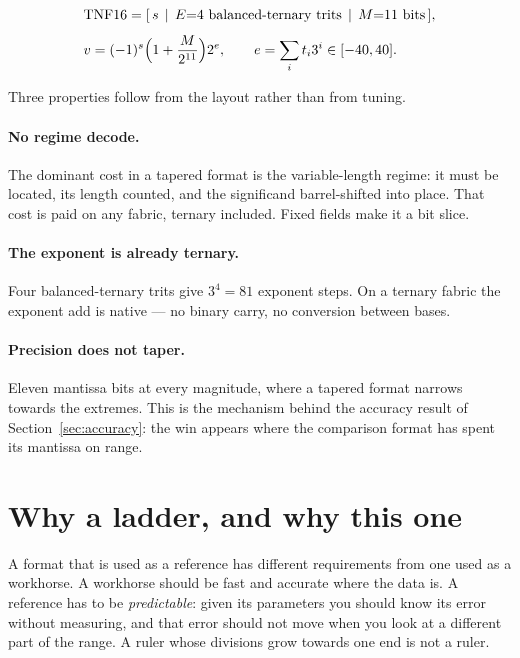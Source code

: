\documentclass[11pt]{article}
\theoremstyle{definition}
\begin{document}
\begin{equation}
\begin{aligned}
&\text{TNF16}=[\,s\,\mid\,E{=}4\ \text{balanced-ternary trits}\,\mid\,M{=}11\ \text{bits}\,],\\[4pt]
&v=(-1)^{s}\Bigl(1+\frac{M}{2^{11}}\Bigr)2^{e},
\qquad e=\sum_{i} t_i 3^i \in [-40,40].
\end{aligned}
\end{equation}

Three properties follow from the layout rather than from tuning.

\paragraph{No regime decode.} The dominant cost in a tapered format is the
variable-length regime: it must be located, its length counted, and the
significand barrel-shifted into place. That cost is paid on any fabric, ternary
included. Fixed fields make it a bit slice.

\paragraph{The exponent is already ternary.} Four balanced-ternary trits give
$3^4=81$ exponent steps. On a ternary fabric the exponent add is native --- no
binary carry, no conversion between bases.

\paragraph{Precision does not taper.} Eleven mantissa bits at every magnitude,
where a tapered format narrows towards the extremes. This is the mechanism behind
the accuracy result of Section~\ref{sec:accuracy}: the win appears where the
comparison format has spent its mantissa on range.


\section{Why a ladder, and why this one}\label{sec:ruler}

A format that is used as a reference has different requirements from one used as
a workhorse. A workhorse should be fast and accurate where the data is. A
reference has to be \emph{predictable}: given its parameters you should know its
error without measuring, and that error should not move when you look at a
different part of the range. A ruler whose divisions grow towards one end is not
a ruler.
\end{document}

